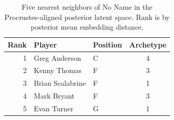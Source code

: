\begin{table}[htbp]
  \centering\small
  \begin{tabular}{rllc}
    \toprule
    Rank & Player & Position & Archetype \\
    \midrule
    1 & Greg Anderson & C & 4 \\
    2 & Kenny Thomas & F & 3 \\
    3 & Brian Scalabrine & F & 1 \\
    4 & Mark Bryant & F & 3 \\
    5 & Evan Turner & G & 1 \\
    \bottomrule
  \end{tabular}
  \caption{Five nearest neighbors of No Name in the Procrustes-aligned posterior latent space. Rank is by posterior mean embedding distance.}
  \label{tab:No_Name_neighbors}
\end{table}

